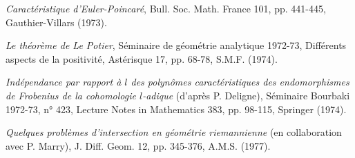 \begin{description}
\item[{[20]}] \emph{Caractéristique d'Euler-Poincaré}, Bull. Soc. Math.
France 101, pp. 441-445, Gauthier-Villars (1973).

\item[{[21]}] \emph{Le théorème de Le Potier}, Séminaire de géométrie
analytique 1972-73, Différents aspects de la positivité, Astérisque 17,
pp. 68-78, S.M.F. (1974).

\item[{[22]}] \emph{Indépendance par rapport à $l$ des polynômes
caractéristiques des endomorphismes de Frobenius de la cohomologie $l$-adique}
(d'après P. Deligne), Séminaire Bourbaki 1972-73, n° 423,
Lecture Notes in Mathematics 383, pp. 98-115, Springer (1974).

\item[{[23]}] \emph{Quelques problèmes d'intersection en géométrie
riemannienne} (en collaboration avec P. Marry), J. Diff. Geom. 12,
pp. 345-376, A.M.S. (1977).
\end{description}


